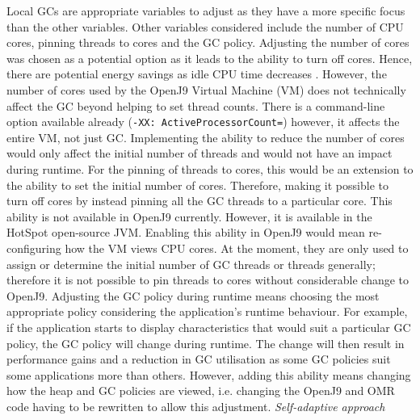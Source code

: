 Local GCs are appropriate variables to adjust as they have a more
specific focus than the other variables.
\newline\newline
Other variables considered include the number of CPU cores, pinning
threads to cores and the GC policy. Adjusting the number of cores was
chosen as a potential option as it leads to the ability to turn off
cores. Hence, there are potential energy savings as idle CPU time
decreases \cite{weiser1994scheduling}. However, the number of cores used by the OpenJ9 Virtual Machine (VM) does not
technically affect the GC beyond helping to set thread counts. There is
a command-line option available already (\verb|-XX: ActiveProcessorCount=|)
however, it affects the entire VM, not just GC. 
\newline\newline
Implementing
the ability to reduce the number of cores would only affect the initial
number of threads and would not have an impact during runtime. For the
pinning of threads to cores, this would be an extension to the ability
to set the initial number of cores. Therefore, making it possible to
turn off cores by instead pinning all the GC threads to a particular
core. This ability is not available in OpenJ9 currently. However, it is
available in the HotSpot open-source JVM. 
\newline\newline 
Enabling this ability in OpenJ9 would mean re-configuring how the VM views CPU cores. At the
moment, they are only used to assign or determine the initial number of
GC threads or threads generally; therefore it is not possible to pin threads
to cores without considerable change to OpenJ9.
\newline\newline
Adjusting the GC policy
during runtime means choosing the most appropriate policy considering
the application's runtime behaviour. For example, if the application
starts to display characteristics that would suit a particular GC
policy, the GC policy will change during runtime. The change will then
result in performance gains and a reduction in GC utilisation as some GC
policies suit some applications more than others. However, adding this
ability means changing how the heap and GC policies are viewed, i.e.
changing the OpenJ9 and OMR code having to be rewritten to allow this adjustment.
\newline\newline
\emph{ Self-adaptive approach}
\newline\newline
